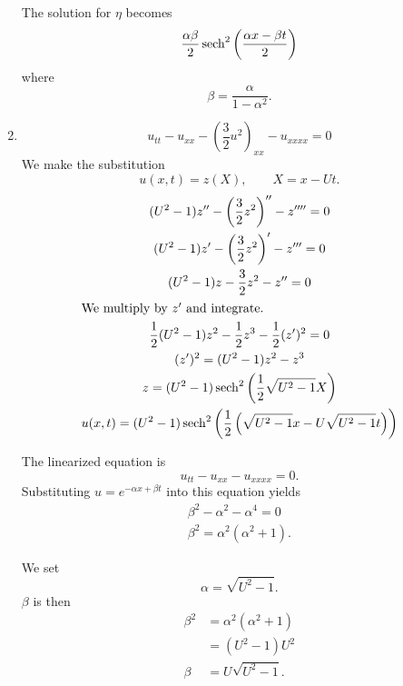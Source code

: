 \begin{Solution}
\begin{enumerate}
    The solution for $\eta$ becomes
    \[\frac{\alpha\beta}{2} \mathop{\mathrm{sech}}\nolimits^2\left( \frac{\alpha x - \beta t}{2} \right)\]
    where
    \[ \beta = \frac{\alpha}{1-\alpha^2}. \]
  \item
    \[u_{tt} - u_{xx} - \left(\frac{3}{2} u^2\right)_{xx} - u_{xxxx}=0\]
    We make the substitution 
    \[ u(x,t) = z(X), \qquad X = x-Ut. \]
    \begin{gather*}
      (U^2-1)z'' - \left(\frac{3}{2} z^2\right)'' - z'''' = 0 \\
      (U^2-1)z' - \left(\frac{3}{2}z^2\right)' - z''' = 0 \\
      (U^2-1)z - \frac{3}{2}z^2 - z'' = 0 \\
      \intertext{We multiply by $z'$ and integrate.}
      \frac{1}{2}(U^2-1)z^2 - \frac{1}{2}z^3 - \frac{1}{2}(z')^2 = 0 \\
      (z')^2 = (U^2-1)z^2 - z^3 \\
      z = (U^2-1) \mathop{\mathrm{sech}}\nolimits^2\left(\frac{1}{2}\sqrt{U^2-1}X\right) \\
      u(x,t) = (U^2-1) \mathop{\mathrm{sech}}\nolimits^2\left(\frac{1}{2}\left(\sqrt{U^2-1} x
          - U \sqrt{U^2-1} t\right)\right)
    \end{gather*}

    The linearized equation is
    \[u_{tt} - u_{xx} - u_{xxxx}=0.\]
    Substituting $u = e^{-\alpha x + \beta t}$ into this equation yields
    \begin{gather*}
      \beta^2 - \alpha^2 - \alpha^4 = 0 \\
      \beta^2 = \alpha^2(\alpha^2+1).
    \end{gather*}

    We set
    \[ \alpha = \sqrt{U^2-1}. \]
    $\beta$ is then
    \begin{align*}
      \beta^2 &= \alpha^2(\alpha^2+1) \\
      &= (U^2-1)U^2 \\
      \beta &= U \sqrt{U^2-1}.
    \end{align*}


\end{enumerate}
\end{Solution}
